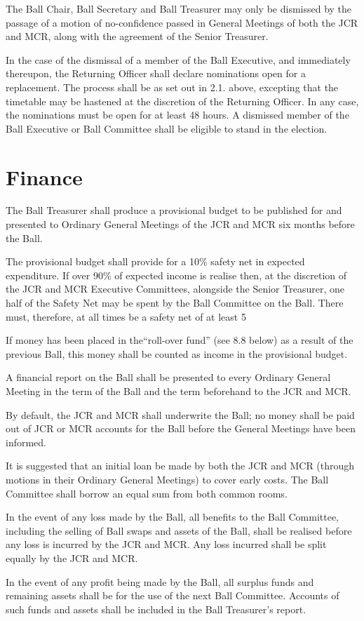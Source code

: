 \appnpara The Ball Chair, Ball Secretary and Ball Treasurer may only be dismissed by the passage of a motion of no-confidence passed in General Meetings of both the JCR and MCR, along with the agreement of the Senior Treasurer.  

\appnpara In the case of the dismissal of a member of the Ball Executive, and immediately thereupon, the Returning Officer shall declare nominations open for a replacement.  The process shall be as set out in 2.1. above, excepting that the timetable may be hastened at the discretion of the Returning Officer.  In any case, the nominations must be open for at least 48 hours.  A dismissed member of the Ball Executive or Ball Committee shall be eligible to stand in the election.  

\section{Finance}

\appnpara The Ball Treasurer shall produce a provisional budget to be published for and presented to Ordinary General Meetings of the JCR and MCR six months before the Ball.

\appnpara The provisional budget shall provide for a 10\% safety net in expected expenditure.  If over 90\% of expected income is realise then, at the discretion of the JCR and MCR Executive Committees, alongside the Senior Treasurer, one half of the Safety Net may be spent by the Ball Committee on the Ball.  There must, therefore, at all times be a safety net of at least 5%

\appnpara If money has been placed in the``roll-over fund'' (see 8.8 below) as a result of the previous Ball, this money shall be counted as income in the provisional budget.

\appnpara A financial report on the Ball shall be presented to every Ordinary General Meeting in the term of the Ball and the term beforehand to the JCR and MCR.

\appnpara By default, the JCR and MCR shall underwrite the Ball; no money shall be paid out of JCR or MCR accounts for the Ball before the General Meetings have been informed.

\appnpara It is suggested that an initial loan be made by both the JCR and MCR (through motions in their Ordinary General Meetings) to cover early costs.  The Ball Committee shall borrow an equal sum from both common rooms.

\appnpara In the event of any loss made by the Ball, all benefits to the Ball Committee, including the selling of Ball swaps and assets of the Ball, shall be realised before any loss is incurred by the JCR and MCR.  Any loss incurred shall be split equally by the JCR and MCR.  

\appnpara In the event of any profit being made by the Ball, all surplus funds and remaining assets shall be for the use of the next Ball Committee.   Accounts of such funds and assets shall be included in the Ball Treasurer's report.  
